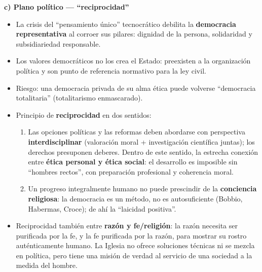 \documentclass[10pt,a4paper]{article}
\begin{document}
\medskip\noindent \textbf{c) Plano político --- ``reciprocidad''}\par\nopagebreak
\begin{itemize}
\item La crisis del ``pensamiento único'' tecnocrático debilita la \textbf{democracia representativa} al corroer sus pilares: dignidad de la persona, solidaridad y subsidiariedad responsable.
\item Los valores democráticos no los crea el Estado: preexisten a la organización política y son punto de referencia normativo para la ley civil.
\item Riesgo: una democracia privada de su alma ética puede volverse ``democracia totalitaria'' (totalitarismo enmascarado).
\item Principio de \textbf{reciprocidad} en dos sentidos:
\begin{enumerate}
\item Las opciones políticas y las reformas deben abordarse con perspectiva \textbf{interdisciplinar} (valoración moral + investigación científica juntas); los derechos presuponen deberes. Dentro de este sentido, la estrecha conexión entre \textbf{ética personal y ética social}: el desarrollo es imposible sin ``hombres rectos'', con preparación profesional y coherencia moral.
\item Un progreso integralmente humano no puede prescindir de la \textbf{conciencia religiosa}: la democracia es un método, no es autosuficiente (Bobbio, Habermas, Croce); de ahí la ``laicidad positiva''.
\end{enumerate}
\item Reciprocidad también entre \textbf{razón y fe/religión}: la razón necesita ser purificada por la fe, y la fe purificada por la razón, para mostrar su rostro auténticamente humano. La Iglesia no ofrece soluciones técnicas ni se mezcla en política, pero tiene una misión de verdad al servicio de una sociedad a la medida del hombre.
\end{itemize}
\end{document}

